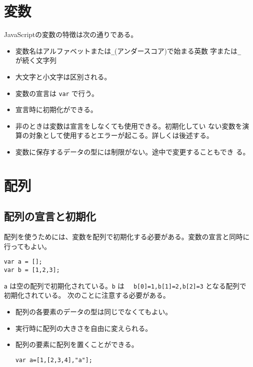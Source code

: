 \section{変数}
JavaScriptの変数の特徴は次の通りである。
\begin{itemize}
 \item 変数名はアルファベットまたは\Verb+_+(アンダースコア)で始まる英数
       字または\Verb+_+ が続く文字列
 \item 大文字と小文字は区別される。
 \item 変数の宣言は \texttt{var} で行う。
 \item 宣言時に初期化ができる。
 \item 非\Strict のときは変数は宣言をしなくても使用できる。初期化してい
       ない変数を演算の対象として使用するとエラーが起こる。詳しくは後述する。
 \item 変数に保存するデータの型には制限がない。途中で変更することもでき
       る。
\end{itemize}
\section{配列}
\subsection{配列の宣言と初期化}
配列を使うためには、変数を配列で初期化する必要がある。変数の宣言と同時に
行ってもよい。
\begin{Verbatim}
var a = [];
var b = [1,2,3];
\end{Verbatim}
\Verb+a+ は空の配列で初期化されている。\Verb+b+ は　
\Verb+b[0]=1,b[1]=2,b[2]=3+ となる配列で初期化されている。
次のことに注意する必要がある。
\begin{itemize}
 \item 配列の各要素のデータの型は同じでなくてもよい。
 \item 実行時に配列の大きさを自由に変えられる。
 \item 配列の要素に配列を置くことができる。
\begin{Verbatim}
var a=[1,[2,3,4],"a"];
\end{Verbatim}
\end{itemize}
